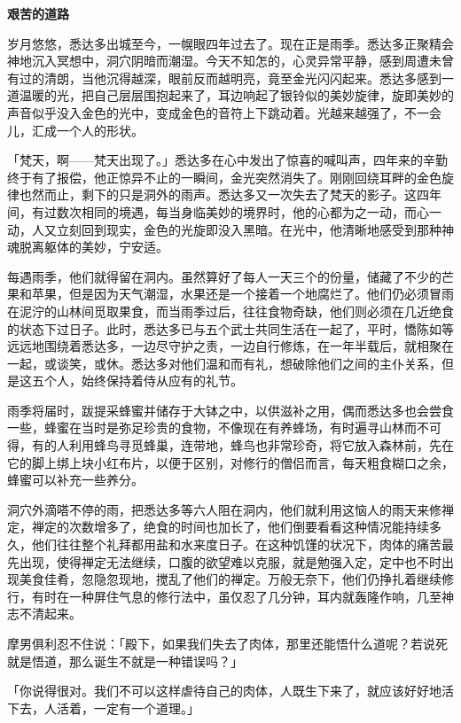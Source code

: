 \documentclass[12pt,twoside,openany]{book}
\newcommand{\mt}[1]{\textbullet \textbf{#1}}
\begin{document}
\mt{艰苦的道路}

岁月悠悠，悉达多出城至今，一幌眼四年过去了。现在正是雨季。悉达多正聚精会神地沉入冥想中，洞穴阴暗而潮湿。今天不知怎的，心灵异常平静，感到周遭未曾有过的清朗，当他沉得越深，眼前反而越明亮，竟至金光闪闪起来。悉达多感到一道温暖的光，把自己层层围抱起来了，耳边响起了银铃似的美妙旋律，旋即美妙的声音似乎没入金色的光中，变成金色的音符上下跳动着。光越来越强了，不一会儿，汇成一个人的形状。

「梵天，啊——梵天出现了。」悉达多在心中发出了惊喜的喊叫声，四年来的辛勤终于有了报偿，他正惊异不止的一瞬间，金光突然消失了。刚刚回绕耳畔的金色旋律也然而止，剩下的只是洞外的雨声。悉达多又一次失去了梵天的影子。这四年间，有过数次相同的境遇，每当身临美妙的境界时，他的心都为之一动，而心一动，人又立刻回到现实，金色的光旋即没入黑暗。在光中，他清晰地感受到那种神魂脱离躯体的美妙，宁安适。

每遇雨季，他们就得留在洞内。虽然算好了每人一天三个的份量，储藏了不少的芒果和苹果，但是因为天气潮湿，水果还是一个接着一个地腐烂了。他们仍必须冒雨在泥泞的山林间觅取果食，而当雨季过后，往往食物奇缺，他们则必须在几近绝食的状态下过日子。此时，悉达多已与五个武士共同生活在一起了，平时，憍陈如等远远地围绕着悉达多，一边尽守护之责，一边自行修炼，在一年半载后，就相聚在一起，或谈笑，或休。悉达多对他们温和而有礼，想破除他们之间的主仆关系，但是这五个人，始终保持着侍从应有的礼节。

雨季将届时，跋提采蜂蜜并储存于大钵之中，以供滋补之用，偶而悉达多也会尝食一些，蜂蜜在当时是弥足珍贵的食物，不像现在有养蜂场，有时遍寻山林而不可得，有的人利用蜂鸟寻觅蜂巢，连带地，蜂鸟也非常珍奇，将它放入森林前，先在它的脚上绑上块小红布片，以便于区别，对修行的僧侣而言，每天粗食糊口之余，蜂蜜可以补充一些养分。

洞穴外滴嗒不停的雨，把悉达多等六人阻在洞内，他们就利用这恼人的雨天来修禅定，禅定的次数增多了，绝食的时间也加长了，他们倒要看看这种情况能持续多久，他们往往整个礼拜都用盐和水来度日子。在这种饥馑的状况下，肉体的痛苦最先出现，使得禅定无法继续，口腹的欲望难以克服，就是勉强入定，定中也不时出现美食佳肴，忽隐忽现地，搅乱了他们的禅定。万般无奈下，他们仍挣扎着继续修行，有时在一种屏住气息的修行法中，虽仅忍了几分钟，耳内就轰隆作响，几至神志不清起来。

摩男俱利忍不住说：「殿下，如果我们失去了肉体，那里还能悟什么道呢？若说死就是悟道，那么诞生不就是一种错误吗？」

「你说得很对。我们不可以这样虐待自己的肉体，人既生下来了，就应该好好地活下去，人活着，一定有一个道理。」
\end{document}
